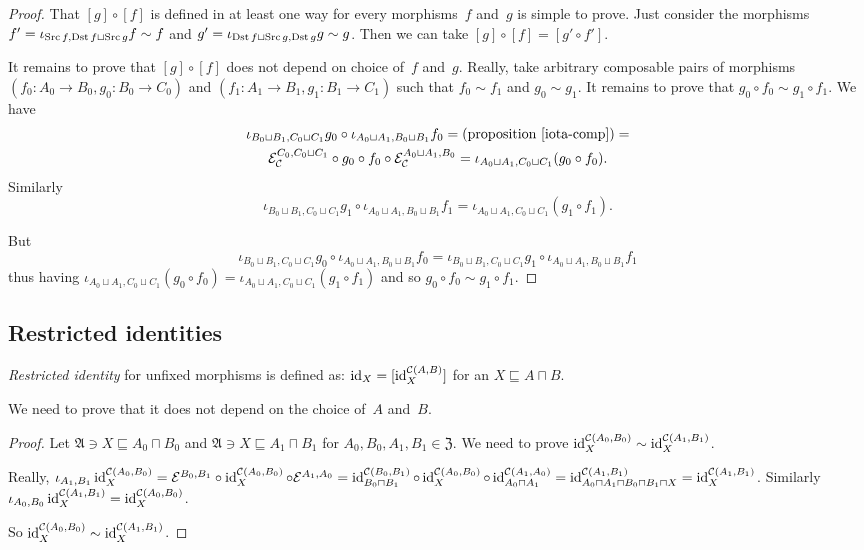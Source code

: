 \begin{proof}
That $[g]\circ[f]$ is defined in at least one way for every
morphisms~$f$ and~$g$ is simple to prove. Just consider the
morphisms
$f'=\iota_{\operatorname{Src} f,\operatorname{Dst} f\sqcup\operatorname{Src} g}f\sim f$ and
$g'=\iota_{\operatorname{Dst} f\sqcup\operatorname{Src} g,\operatorname{Dst} g}g\sim g$.
Then we can take $[g]\circ[f]=[g'\circ f']$.

It remains to prove that $[g]\circ[f]$ does not depend on
choice of~$f$ and~$g$. Really, take arbitrary composable
pairs of morphisms $(f_0:A_0\to B_0,g_0:B_0\to C_0)$ and
$(f_1:A_1\to B_1,g_1:B_1\to C_1)$ such that
$f_0\sim f_1$ and $g_0\sim g_1$. It remains to prove that
$g_0\circ f_0\sim g_1\circ f_1$.
We have
\begin{multline*}
\iota_{B_0\sqcup B_1,C_0\sqcup C_1}g_0 \circ
\iota_{A_0\sqcup A_1,B_0\sqcup B_1}f_0
= \text{(proposition~\ref{iota-comp})} = \\
\mathcal{E}_{\mathcal{C}}^{C_0,C_0\sqcup C_1}\circ g_0 \circ
f_0\circ\mathcal{E}_{\mathcal{C}}^{A_0\sqcup A_1,B_0} =
\iota_{A_0\sqcup A_1,C_0\sqcup C_1}(g_0\circ f_0).
\end{multline*}
Similarly
\[\iota_{B_0\sqcup B_1,C_0\sqcup C_1}g_1 \circ
\iota_{A_0\sqcup A_1,B_0\sqcup B_1}f_1 =
\iota_{A_0\sqcup A_1,C_0\sqcup C_1}(g_1\circ f_1).\]

But
\[\iota_{B_0\sqcup B_1,C_0\sqcup C_1}g_0 \circ
\iota_{A_0\sqcup A_1,B_0\sqcup B_1}f_0 =
\iota_{B_0\sqcup B_1,C_0\sqcup C_1}g_1 \circ
\iota_{A_0\sqcup A_1,B_0\sqcup B_1}f_1\]
thus having
$\iota_{A_0\sqcup A_1,C_0\sqcup C_1}(g_0\circ f_0) =
\iota_{A_0\sqcup A_1,C_0\sqcup C_1}(g_1\circ f_1)$ and so
$g_0\circ f_0\sim g_1\circ f_1$.
\end{proof}

\subsection{Restricted identities}

\begin{defn}
\emph{Restricted identity} for unfixed morphisms is
defined as: $\operatorname{id}_X = [\operatorname{id}^{\mathcal{C}(A,B)}_X]$ for
an $X\sqsubseteq A\sqcap B$.
\end{defn}

We need to prove that it does not depend on the choice
of~$A$ and~$B$.

\begin{proof}
Let $\mathfrak{A}\ni X\sqsubseteq A_0\sqcap B_0$ and
$\mathfrak{A}\ni X\sqsubseteq A_1\sqcap B_1$ for
$A_0,B_0,A_1,B_1\in\mathfrak{Z}$. We need to prove
$\operatorname{id}^{\mathcal{C}(A_0,B_0)}_X\sim
\operatorname{id}^{\mathcal{C}(A_1,B_1)}_X$.

Really, $\iota_{A_1,B_1}\operatorname{id}^{\mathcal{C}(A_0,B_0)}_X =
\mathcal{E}^{B_0,B_1}\circ\operatorname{id}^{\mathcal{C}(A_0,B_0)}_X
\circ \mathcal{E}^{A_1,A_0} =
\operatorname{id}^{\mathcal{C}(B_0,B_1)}_{B_0\sqcap B_1}\circ
\operatorname{id}^{\mathcal{C}(A_0,B_0)}_X\circ
\operatorname{id}^{\mathcal{C}(A_1,A_0)}_{A_0\sqcap A_1} =
\operatorname{id}^{\mathcal{C}(A_1,B_1)}_{A_0\sqcap A_1\sqcap B_0\sqcap B_1\sqcap X} =
\operatorname{id}^{\mathcal{C}(A_1,B_1)}_X$.
Similarly
$\iota_{A_0,B_0}\operatorname{id}^{\mathcal{C}(A_1,B_1)}_X =
\operatorname{id}^{\mathcal{C}(A_0,B_0)}_X$.

So $\operatorname{id}^{\mathcal{C}(A_0,B_0)}_X\sim
\operatorname{id}^{\mathcal{C}(A_1,B_1)}_X$.
\end{proof}

